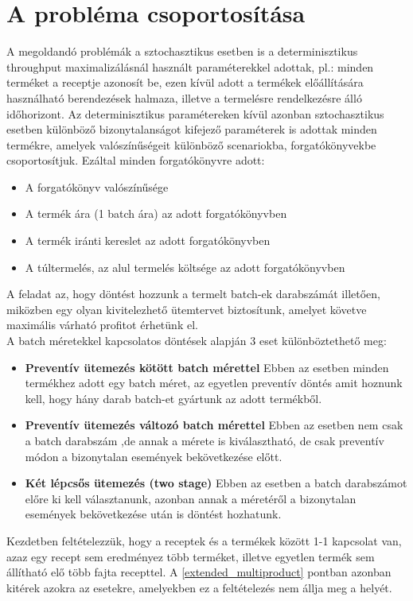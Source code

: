 \section{A probléma csoportosítása} \label{problem_csop}
A megoldandó problémák a sztochasztikus esetben is a determinisztikus throughput maximalizálásnál használt paraméterekkel adottak, pl.: minden terméket a receptje azonosít be, ezen kívül adott a termékek előállítására használható berendezések halmaza, illetve a termelésre rendelkezésre álló időhorizont.
Az determinisztikus paramétereken kívül azonban sztochasztikus esetben különböző bizonytalanságot kifejező paraméterek is adottak minden termékre, amelyek valószínűségeit különböző scenariokba, forgatókönyvekbe csoportosítjuk.
Ezáltal minden forgatókönyvre adott: 
\begin{itemize}
\item{A forgatókönyv valószínűsége}
\item{A termék ára (1 batch ára) az adott forgatókönyvben}
\item{A termék iránti kereslet az adott forgatókönyvben}
\item{A túltermelés, az alul termelés költsége az adott forgatókönyvben}
\end{itemize}
A feladat az, hogy döntést hozzunk a termelt batch-ek darabszámát illetően, miközben egy olyan kivitelezhető ütemtervet biztosítunk, amelyet követve maximális várható profitot érhetünk el.\\
A batch méretekkel kapcsolatos döntések alapján 3 eset különböztethető meg:
\begin{itemize}
\item \textbf{Preventív ütemezés kötött batch mérettel} Ebben az esetben minden termékhez adott egy batch méret, az egyetlen preventív döntés amit hoznunk kell, hogy hány darab batch-et gyártunk az adott termékből.
\item \textbf{Preventív ütemezés változó batch mérettel} Ebben az esetben nem csak a batch darabszám ,de annak a mérete is kiválasztható, de csak preventív módon a bizonytalan események bekövetkezése előtt.
\item \textbf{Két lépcsős ütemezés (two stage)} Ebben az esetben a batch darabszámot előre ki kell választanunk, azonban annak a méretéről a bizonytalan események bekövetkezése után is döntést hozhatunk.
\end{itemize}
Kezdetben feltételezzük, hogy a receptek és a termékek között 1-1 kapcsolat van, azaz egy recept sem eredményez több terméket, illetve egyetlen termék sem állítható elő több fajta recepttel.
A \ref{extended_multiproduct} pontban azonban kitérek azokra az esetekre, amelyekben ez a feltételezés nem állja meg a helyét.
